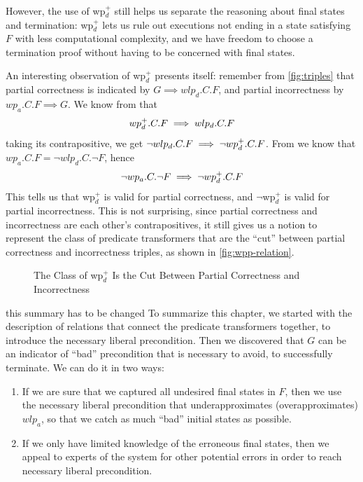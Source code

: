 However, the use of wp$_d^+$ still helps us separate the reasoning about final states and termination: wp$_d^+$ lets us rule out executions not ending in a state satisfying $F$ with less computational complexity, and we have freedom to choose a termination proof without having to be concerned with final states. 

An interesting observation of wp$_d^+$ presents itself: remember from \autoref{fig:triples} that partial correctness is indicated by $G\implies wlp_d.C.F$, and partial incorrectness by $wp_a.C.F\implies G$. 
We know from  that $$wp_d^+.C.F\implies wlp_d.C.F$$ taking its contrapositive, we get $\neg wlp_d.C.F\implies \neg wp_d^+.C.F$. 
From  we know that $wp_a.C.F = \neg wlp_d.C.\neg F$, hence $$\neg wp_a.C.\neg F\implies \neg wp_d^+.C.F$$
This tells us that wp$_d^+$ is valid for partial correctness, and $\neg$wp$_d^+$ is valid for partial incorrectness. 
This is not surprising, since partial correctness and incorrectness are each other's contrapositives, it still gives us a notion to represent the class of predicate transformers that are the ``cut'' between partial correctness and incorrectness triples, as shown in \autoref{fig:wpp-relation}. 
\begin{figure}[ht]
	\centering
	
	\caption{The Class of wp$_d^+$ Is the Cut Between Partial Correctness and Incorrectness}
	\label{fig:wpp-relation}
\end{figure}

\medskip
\colorbox{red!30}{
	this summary has to be changed
}%
To summarize this chapter, we started with the description of relations that connect the predicate transformers together, to introduce the necessary liberal precondition. 
Then we discovered that $G$ can be an indicator of ``bad'' precondition that is necessary to avoid, to successfully terminate. 
We can do it in two ways: 
\begin{enumerate}
	\item If we are sure that we captured all undesired final states in $F$, then we use the necessary liberal precondition that underapproximates (overapproximates) $wlp_a$, so that we catch as much ``bad'' initial states as possible. 
	\item If we only have limited knowledge of the erroneous final states, then we appeal to experts of the system for other potential errors in order to reach necessary liberal precondition. 
\end{enumerate}



